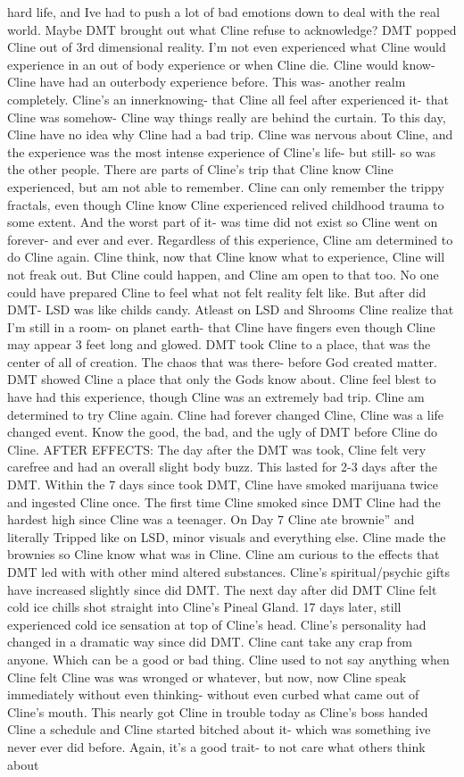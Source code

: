 \documentclass[12pt]{book}
\begin{document}
hard life, and Ive had to push a lot of bad emotions down to deal with the real world. Maybe DMT brought out what Cline refuse to acknowledge? DMT popped Cline out of 3rd dimensional reality. I'm not even experienced what Cline would experience in an out of body experience or when Cline die. Cline would know- Cline have had an outerbody experience before. This was- another realm completely. Cline's an innerknowing- that Cline all feel after experienced it- that Cline was somehow- Cline way things really are behind the curtain. To this day, Cline have no idea why Cline had a bad trip. Cline was nervous about Cline, and the experience was the most intense experience of Cline's life- but still- so was the other people. There are parts of Cline's trip that Cline know Cline experienced, but am not able to remember. Cline can only remember the trippy fractals, even though Cline know Cline experienced relived childhood trauma to some extent. And the worst part of it- was time did not exist so Cline went on forever- and ever and ever. Regardless of this experience, Cline am determined to do Cline again. Cline think, now that Cline know what to experience, Cline will not freak out. But Cline could happen, and Cline am open to that too. No one could have prepared Cline to feel what not felt reality felt like. But after did DMT- LSD was like childs candy. Atleast on LSD and Shrooms Cline realize that I'm still in a room- on planet earth- that Cline have fingers even though Cline may appear 3 feet long and glowed. DMT took Cline to a place, that was the center of all of creation. The chaos that was there- before God created matter. DMT showed Cline a place that only the Gods know about. Cline feel blest to have had this experience, though Cline was an extremely bad trip. Cline am determined to try Cline again. Cline had forever changed Cline, Cline was a life changed event. Know the good, the bad, and the ugly of DMT before Cline do Cline. AFTER EFFECTS: The day after the DMT was took, Cline felt very carefree and had an overall slight body buzz. This lasted for 2-3 days after the DMT. Within the 7 days since took DMT, Cline have smoked marijuana twice and ingested Cline once. The first time Cline smoked since DMT Cline had the hardest high since Cline was a teenager. On Day 7 Cline ate brownie'' and literally Tripped like on LSD, minor visuals and everything else. Cline made the brownies so Cline know what was in Cline. Cline am curious to the effects that DMT led with with other mind altered substances. Cline's spiritual/psychic gifts have increased slightly since did DMT. The next day after did DMT Cline felt cold ice chills shot straight into Cline's Pineal Gland. 17 days later, still experienced cold ice sensation at top of Cline's head. Cline's personality had changed in a dramatic way since did DMT. Cline cant take any crap from anyone. Which can be a good or bad thing. Cline used to not say anything when Cline felt Cline was was wronged or whatever, but now, now Cline speak immediately without even thinking- without even curbed what came out of Cline's mouth. This nearly got Cline in trouble today as Cline's boss handed Cline a schedule and Cline started bitched about it- which was something ive never ever did before. Again, it's a good trait- to not care what others think about 
\end{document}
